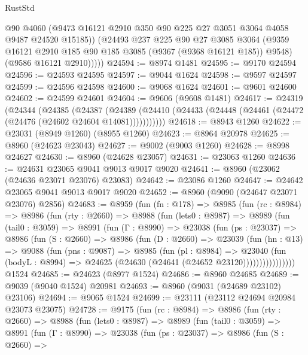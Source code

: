 \begin{lexlean}{RustStd}
\begin{coremodule}
            @90
            @4060
            (@9473 @16121 @2910 @350 @90 @225 @27 @3051 @3064 @4058 @9487 @24520 @15185))
          (@24493
            @237
            @225
            @90
            @27
            @3085
            @3064
            (@9359 @16121 @2910 @185 @90 @185 @3085 (@9367 (@9368 @16121 @185)) @9548)
            (@9586 @16121 @2910)))))
@24594 := @8974 @1481
@24595 := @9170 @24594
@24596 := @24593 @24595
@24597 := @9044 @1624
@24598 := @9597 @24597
@24599 := @24596 @24598
@24600 := @9068 @1624
@24601 := @9601 @24600
@24602 := @24599 @24601
@24604 := @9606 (@9608 @1481)
@24617 := @24319
    (@24344
      (@24385
        (@24387
          (@24389 (@24410 (@24433 (@24448 (@24461 (@24472 (@24476 (@24602 @24604 @14081)))))))))))
@24618 := @8943 @1260
@24622 := @23031 (@8949 @1260) (@8955 @1260)
@24623 := @8964 @20978
@24625 := @8960 (@24623 @23043)
@24627 := @9002 (@9003 @1260)
@24628 := @8998 @24627
@24630 := @8960 (@24628 @23057)
@24631 := @23063 @1260
@24636 := @24631 @23065 @9041 @9013 @9017 @9020
@24641 := @8960 (@23062 (@24636 @23071 @23076) @23083)
@24642 := @23086 @1260
@24647 := @24642 @23065 @9041 @9013 @9017 @9020
@24652 := @8960 (@9090 (@24647 @23071 @23076) @2856)
@24683 := @8959
    (fun (fn : @178) =>
    @8985
      (fun (rc : @8984) =>
      @8986
        (fun (rty : @2660) =>
        @8988
          (fun (lets0 : @8987) =>
          @8989
            (fun (tail0 : @3059) =>
            @8991
              (fun (Γ : @8990) =>
              @23038
                (fun (ps : @23037) =>
                @8986
                  (fun (S : @2660) =>
                  @8986
                    (fun (D : @2660) =>
                    @23039
                      (fun (hn : @13) =>
                      @9088
                        (fun (pns : @9087) =>
                        @8985
                          (fun (pl : @8984) =>
                          @23040
                            (fun (bodyL : @8994) =>
                            @24625 (@24630 (@24641 (@24652 @23120))))))))))))))))
    @1524
@24685 := @24623 (@8977 @1524)
@24686 := @8960 @24685
@24689 := @9039 (@9040 @1524) @20981
@24693 := @8960 (@9031 (@24689 @23102) @23106)
@24694 := @9065 @1524
@24699 := @23111 (@23112 @24694 @20984 @23073 @23075)
@24728 := @9175
    (fun (rc : @8984) =>
    @8986
      (fun (rty : @2660) =>
      @8988
        (fun (lets0 : @8987) =>
        @8989
          (fun (tail0 : @3059) =>
          @8991
            (fun (Γ : @8990) =>
            @23038
              (fun (ps : @23037) =>
              @8986
                (fun (S : @2660) =>

\end{coremodule}
\end{lexlean}
